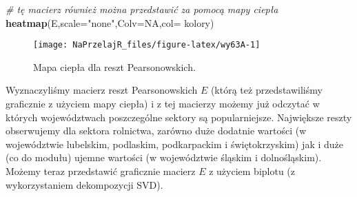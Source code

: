 \documentclass[polish,]{book}
\newenvironment{Shaded}{\begin{snugshade}}{\end{snugshade}}
\newcommand{\AlertTok}[1]{\textcolor[rgb]{0.94,0.16,0.16}{#1}}
\newcommand{\CommentTok}[1]{\textcolor[rgb]{0.56,0.35,0.01}{\textit{#1}}}
\newcommand{\DataTypeTok}[1]{\textcolor[rgb]{0.13,0.29,0.53}{#1}}
\newcommand{\DecValTok}[1]{\textcolor[rgb]{0.00,0.00,0.81}{#1}}
\newcommand{\KeywordTok}[1]{\textcolor[rgb]{0.13,0.29,0.53}{\textbf{#1}}}
\newcommand{\NormalTok}[1]{#1}
\newcommand{\OperatorTok}[1]{\textcolor[rgb]{0.81,0.36,0.00}{\textbf{#1}}}
\newcommand{\OtherTok}[1]{\textcolor[rgb]{0.56,0.35,0.01}{#1}}
\newcommand{\StringTok}[1]{\textcolor[rgb]{0.31,0.60,0.02}{#1}}
\begin{document}
\begin{Shaded}
\begin{Highlighting}[]
\CommentTok{# tę macierz również można przedstawić za pomocą mapy ciepła}
\KeywordTok{heatmap}\NormalTok{(E,}\DataTypeTok{scale=}\StringTok{"none"}\NormalTok{,}\DataTypeTok{Colv=}\OtherTok{NA}\NormalTok{,}\DataTypeTok{col=}\NormalTok{ kolory)}
\end{Highlighting}
\end{Shaded}

\begin{figure}[h]

{\centering \texttt{[image: NaPrzelajR\_files/figure-latex/wy63A-1]} 

}

\caption{Mapa ciepła dla reszt Pearsonowskich.}\label{fig:wy63A}
\end{figure}

Wyznaczyliśmy macierz reszt Pearsonowskich \(E\) (którą też przedstawiliśmy graficznie z użyciem mapy ciepła) i z tej macierzy możemy już odczytać w których
województwach poszczególne sektory są popularniejsze. Największe reszty obserwujemy dla sektora rolnictwa, zarówno duże dodatnie wartości (w województwie lubelskim, podlaskim, podkarpackim i świętokrzyskim) jak i duże (co do modułu) ujemne wartości (w województwie śląskim i dolnośląskim).
Możemy teraz przedstawić graficznie macierz \(E\) z użyciem biplotu (z wykorzystaniem dekompozycji SVD).

\begin{Shaded}
\end{Shaded}
\end{document}
